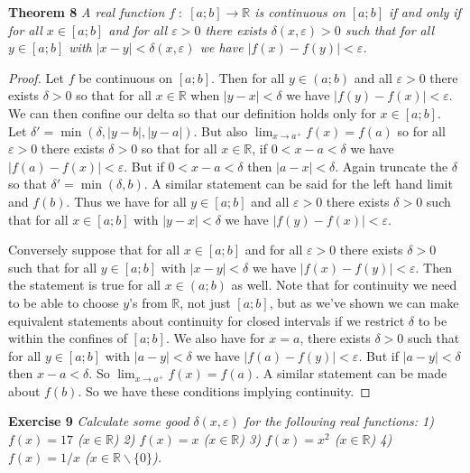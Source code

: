 \documentclass{article}
\begin{document}
\begin{flushleft}
\textbf{Theorem 8}
\textsl{A real function $f \; : \; [a;b] \rightarrow \mathbb{R}$ is continuous on $[a;b]$ if and only if for all $x \in [a;b]$ and for all $\varepsilon > 0$ there exists $\delta(x, \varepsilon) > 0$ such that for all $y \in [a;b]$ with $|x-y| < \delta(x, \varepsilon)$ we have $|f(x)-f(y)| < \varepsilon$.}
\begin{proof}
Let $f$ be continuous on $[a;b]$. Then for all $y \in (a;b)$ and all $\varepsilon > 0$ there exists $\delta > 0$ so that for all $x \in \mathbb{R}$ when $|y-x| < \delta$ we have $|f(y) - f(x)| < \varepsilon$. We can then confine our delta so that our definition holds only for $x \in [a;b]$. Let $\delta' = \min (\delta, |y-b|, |y-a|)$. But also $\lim_{x \rightarrow a^+} f(x) = f(a)$ so for all $\varepsilon > 0$ there exists $\delta > 0$ so that for all $x \in \mathbb{R}$, if $0 < x - a < \delta$ we have $|f(a) - f(x)| < \varepsilon$. But if $0 < x-a < \delta$ then $|a-x| < \delta$. Again truncate the $\delta$ so that $\delta' = \min (\delta, b)$. A similar statement can be said for the left hand limit and $f(b)$. Thus we have for all $y \in [a;b]$ and all $\varepsilon > 0$ there exists $\delta > 0$ such that for all $x \in [a;b]$ with $|y-x| < \delta$ we have $|f(y)-f(x)| < \varepsilon$.\newline

Conversely suppose that for all $x \in [a;b]$ and for all $\varepsilon > 0$ there exists $\delta > 0$ such that for all $y \in [a;b]$ with $|x-y| < \delta$ we have $|f(x) - f(y)| < \varepsilon$. Then the statement is true for all $x \in (a;b)$ as well. Note that for continuity we need to be able to choose $y$'s from $\mathbb{R}$, not just $[a;b]$, but as we've shown we can make equivalent statements about continuity for closed intervals if we restrict $\delta$ to be within the confines of $[a;b]$. We also have for $x=a$, there exists $\delta > 0$ such that for all $y \in [a;b]$ with $|a-y| < \delta$ we have $|f(a) - f(y)| < \varepsilon$. But if $|a-y| < \delta$ then $x-a < \delta$. So $\lim_{x \rightarrow a^+} f(x) = f(a)$. A similar statement can be made about $f(b)$. So we have these conditions implying continuity.
\end{proof}

\textbf{Exercise 9}
\textsl{Calculate some good $\delta(x, \varepsilon)$ for the following real functions:
1) $f(x) = 17$ ($x \in \mathbb{R}$)
2) $f(x) = x$ ($x \in \mathbb{R}$)
3) $f(x) = x^2$ ($x \in \mathbb{R}$)
4) $f(x) = 1/x$ ($x \in \mathbb{R} \backslash \{0\}$).}\newline


\end{flushleft}
\end{document}
